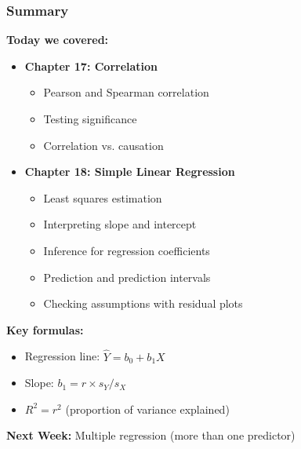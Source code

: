 \documentclass{beamer}
\begin{document}
\begin{frame}
\frametitle{Summary}
\textbf{Today we covered:}
\begin{itemize}
\item \textbf{Chapter 17: Correlation}
  \begin{itemize}
  \item Pearson and Spearman correlation
  \item Testing significance
  \item Correlation vs. causation
  \end{itemize}

\item \textbf{Chapter 18: Simple Linear Regression}
  \begin{itemize}
  \item Least squares estimation
  \item Interpreting slope and intercept
  \item Inference for regression coefficients
  \item Prediction and prediction intervals
  \item Checking assumptions with residual plots
  \end{itemize}
\end{itemize}

\vspace{0.5cm}
\textbf{Key formulas:}
\begin{itemize}
\item Regression line: $\hat{Y} = b_0 + b_1 X$
\item Slope: $b_1 = r \times s_Y / s_X$
\item $R^2 = r^2$ (proportion of variance explained)
\end{itemize}

\vspace{0.3cm}
\textbf{Next Week:} Multiple regression (more than one predictor)
\end{frame}
\end{document}
